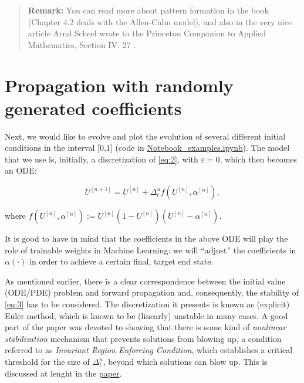 \documentclass[openany,twoside]{book}
\begin{document}
\begin{quote}
\textbf{Remark:} You can read more about pattern formation in the book \citep{Nishiura} (Chapter 4.2 deals with the Allen-Cahn model), and also in the very nice article Arnd Scheel wrote to the Princeton Companion to Applied Mathematics, Section IV. 27 \citep{Arnd_companion}.
\end{quote}

\hypertarget{propagation-with-randomly-generated-coefficients}{%
\section{Propagation with randomly generated coefficients}\label{propagation-with-randomly-generated-coefficients}}

Next, we would like to evolve and plot the evolution of several different initial conditions in the interval {[}0,1{]} (code in \href{https://github.com/rafael-a-monteiro-math/Binary_classification_phase_separation/blob/master/Notebook_PSBC_examples.ipynb}{Notebook\_examples.ipynb}). The model that we use is, initially, a discretization of \eqref{eq:2}, with \(\varepsilon = 0\), which then becomes an ODE:

\begin{equation}
U^{[n+1]} = U^{[n]} + \Delta_t^{u}f(U^{[n]},\alpha^{[n]}),\label{eq:3}
\end{equation}

where \(f(U^{[n]},\alpha^{[n]}):= U^{[n]}(1 - U^{[n]})(U^{[n]} - \alpha^{[n]} )\).

It is good to have in mind that the coefficients in the above ODE will play the role of trainable weights in Machine Learning: we will ``adjust'' the coefficients in \(\alpha(\cdot)\) in order to achieve a certain final, target end state.

As mentioned earlier, there is a clear correspondence between the initial value (ODE/PDE) problem and forward propagation and, consequently, the stability of \eqref{eq:3} has to be considered. The discretization it presents is known as (explicit) Euler method, which is known to be (linearly) unstable in many cases. A good part of the paper was devoted to showing that there is some kind of \emph{nonlinear stabilization} mechanism that prevents solutions from blowing up, a condition referred to as \emph{Invariant Region Enforcing Condition}, which establishes a critical threshold for the size of \(\Delta_t^u\), beyond which solutions can blow up. This is discussed at lenght in the \href{https://arxiv.org/abs/2009.02467}{paper}.
\end{document}
